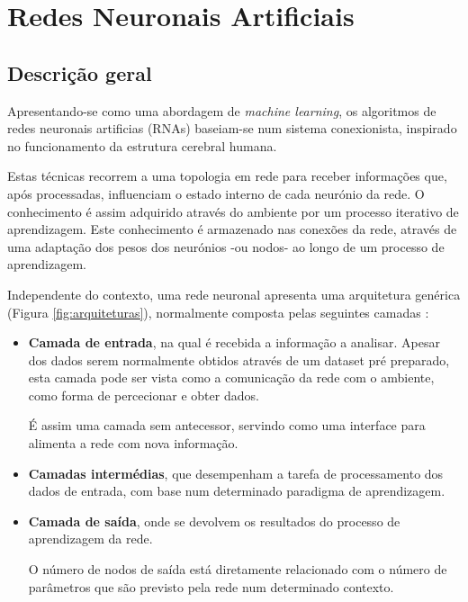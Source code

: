 \chapter{Redes Neuronais Artificiais}
\label{chp:rna}

\section{Descrição geral}
\label{sec:RNA-Descricao}

Apresentando-se como uma abordagem de \textit{machine learning}, os algoritmos de redes neuronais artificias (RNAs) baseiam-se num sistema conexionista, inspirado no funcionamento da estrutura cerebral humana.

Estas técnicas recorrem a uma topologia em rede para receber informações que, após processadas, influenciam o estado interno de cada neurónio da rede.
O conhecimento é assim adquirido através do ambiente por um processo iterativo de aprendizagem. 
Este conhecimento é armazenado nas conexões da rede, através de uma adaptação dos pesos dos neurónios -ou nodos- ao longo de um processo de aprendizagem. 

Independente do contexto, uma rede neuronal apresenta uma arquitetura genérica (Figura \ref{fig:arquiteturas}), normalmente composta pelas seguintes camadas \cite{CortezNevesANN, ann-agility}: 
\begin{itemize}
    \item \textbf{Camada de entrada}, na qual é recebida a informação a analisar. 
    Apesar dos dados serem normalmente obtidos através de um dataset pré preparado, esta camada pode ser vista como a comunicação da rede com o ambiente, como forma de percecionar e obter dados. 
    
    É assim uma camada sem antecessor, servindo como uma interface para alimenta a rede com nova informação. 
    
    \item \textbf{Camadas intermédias}, que desempenham a tarefa de processamento dos dados de entrada, com base num determinado paradigma de aprendizagem. 
    
    \item \textbf{Camada de saída}, onde se devolvem os resultados do processo de aprendizagem da rede. 
    
    O número de nodos de saída está diretamente relacionado com o número de parâmetros que são previsto pela rede num determinado contexto. 
\end{itemize}

